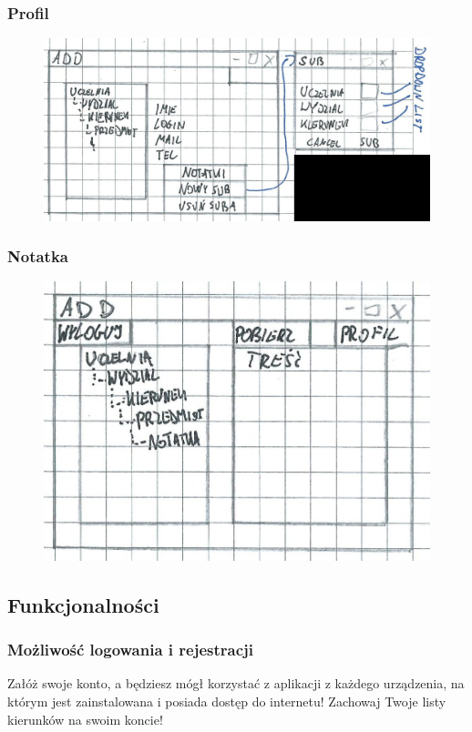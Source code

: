 \documentclass[12pt,a4paper]{article}
\begin{document}
			\subsubsection{Profil}
				\begin{figure}[H]
					\centering
					\includegraphics[]{profil}
				\end{figure}
			\subsubsection{Notatka}
				\begin{figure}[H]
					\centering
					\includegraphics[]{notka}
				\end{figure}
\clearpage	\subsection{Funkcjonalności}
			\subsubsection{Możliwość logowania i rejestracji}
				Załóż swoje konto, a będziesz mógł korzystać z aplikacji z każdego urządzenia, na którym jest zainstalowana i posiada dostęp do internetu! Zachowaj Twoje listy kierunków na swoim koncie!
\end{document}
